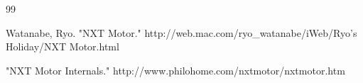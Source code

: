 \documentclass[onecolumn, draftclass]{IEEEtran} %
\begin{document}

\begin{thebibliography} {99}

Watanabe, Ryo.  "NXT Motor."  http://web.mac.com/ryo\_watanabe/iWeb/Ryo's Holiday/NXT Motor.html

"NXT Motor Internals."  http://www.philohome.com/nxtmotor/nxtmotor.htm

\end{thebibliography}
\end{document}
